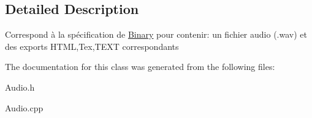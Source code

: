 \subsection{\-Detailed \-Description}
\-Correspond à la spécification de \hyperlink{classBinary}{\-Binary} pour contenir\-: un fichier audio (.wav) et des exports \-H\-T\-M\-L,\-Tex,\-T\-E\-X\-T correspondants 

\-The documentation for this class was generated from the following files\-:\begin{DoxyCompactItemize}
\item 
\-Audio.\-h\item 
\-Audio.\-cpp\end{DoxyCompactItemize}
